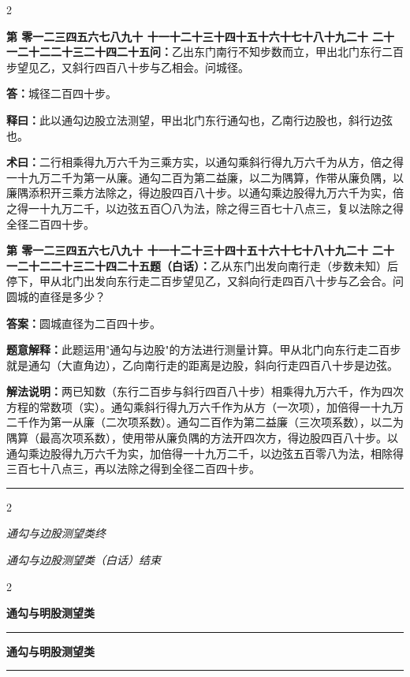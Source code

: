 \documentclass[10pt,a4paper]{article}
\newcommand{\longline}{\noindent\rule{\textwidth}{0.4pt}}
\newcounter{probnum}
\newcounter{probnumvol}[section]
\newcommand{\chnum}[1]{%
  \ifcase#1 零\or 一\or 二\or 三\or 四\or 五\or 六\or 七\or 八\or 九\or 十\or
    十一\or 十二\or 十三\or 十四\or 十五\or 十六\or 十七\or 十八\or 十九\or 二十\or
    二十一\or 二十二\or 二十三\or 二十四\or 二十五\fi}
\newcommand{\problemclassical}[1]{%
  \stepcounter{probnumvol}%
  \par\noindent
  \textcolor{classicalcolor}{\textbf{第\chnum{\value{probnumvol}}问：}}#1\par\smallskip
}
\newcommand{\problemmodern}[1]{%
  \par\noindent
  \textcolor{moderncolor}{\textbf{第\chnum{\value{probnumvol}}题（白话）：}}#1\par\smallskip
}
\newcommand{\answerclassical}[1]{%
  \par\noindent\textcolor{classicalcolor}{\textbf{答：}}#1\par
}
\newcommand{\answermodern}[1]{%
  \par\noindent\textcolor{moderncolor}{\textbf{答案：}}#1\par
}
\newcommand{\shiyiclassical}[1]{%
  \par\noindent\textcolor{classicalcolor}{\textbf{释曰：}}#1\par
}
\newcommand{\shiyimodern}[1]{%
  \par\noindent\textcolor{moderncolor}{\textbf{题意解释：}}#1\par
}
\newcommand{\shuyueclassical}[1]{%
  \par\noindent\textcolor{classicalcolor}{\textbf{术曰：}}#1\par
}
\newcommand{\shuyuemodern}[1]{%
  \par\noindent\textcolor{moderncolor}{\textbf{解法说明：}}#1\par
}
\newcommand{\volheaderclassical}[1]{%
  \begin{center}{\large\bfseries\color{volcolor} #1}\end{center}
  \vspace{0.3cm}
  \longline
  \vspace{0.3cm}
}
\newcommand{\volheadermodern}[1]{%
  \begin{center}{\large\bfseries\color{volcolor} #1}\end{center}
  \vspace{0.3cm}
  \longline
  \vspace{0.3cm}
}
\newcommand{\endclassical}[1]{%
  \vspace{0.3cm}
  \begin{center}\textit{#1}\end{center}
}
\newcommand{\endmodern}[1]{%
  \vspace{0.3cm}
  \begin{center}\textit{#1}\end{center}
}
\begin{document}
\begin{paracol}{2}

\problemclassical{乙出东门南行不知步数而立，甲出北门东行二百步望见乙，又斜行四百八十步与乙相会。问城径。}

\answerclassical{城径二百四十步。}

\shiyiclassical{此以通勾边股立法测望，甲出北门东行通勾也，乙南行边股也，斜行边弦也。}

\shuyueclassical{二行相乘得九万六千为三乘方实，以通勾乘斜行得九万六千为从方，倍之得一十九万二千为第一从廉。通勾二百为第二益廉，以二为隅算，作带从廉负隅，以廉隅添积开三乘方法除之，得边股四百八十步。以通勾乘边股得九万六千为实，倍之得一十九万二千，以边弦五百〇八为法，除之得三百七十八点三，复以法除之得全径二百四十步。}

\switchcolumn

\problemmodern{乙从东门出发向南行走（步数未知）后停下，甲从北门出发向东行走二百步望见乙，又斜向行走四百八十步与乙会合。问圆城的直径是多少？}

\answermodern{圆城直径为二百四十步。}

\shiyimodern{此题运用"通勾与边股"的方法进行测量计算。甲从北门向东行走二百步就是通勾（大直角边），乙向南行走的距离是边股，斜向行走四百八十步是边弦。}

\shuyuemodern{两已知数（东行二百步与斜行四百八十步）相乘得九万六千，作为四次方程的常数项（实）。通勾乘斜行得九万六千作为从方（一次项），加倍得一十九万二千作为第一从廉（二次项系数）。通勾二百作为第二益廉（三次项系数），以二为隅算（最高次项系数），使用带从廉负隅的方法开四次方，得边股四百八十步。以通勾乘边股得九万六千为实，加倍得一十九万二千，以边弦五百零八为法，相除得三百七十八点三，再以法除之得到全径二百四十步。}

\end{paracol}

\vspace{0.5cm}
\longline
\begin{paracol}{2}
\endclassical{通勾与边股测望类终}
\switchcolumn
\endmodern{通勾与边股测望类（白话）结束}
\end{paracol}

\newpage

\setcounter{probnumvol}{0}

\begin{paracol}{2}

\volheaderclassical{通勾与明股测望类}

\switchcolumn

\volheadermodern{通勾与明股测望类}

\end{paracol}
\end{document}
